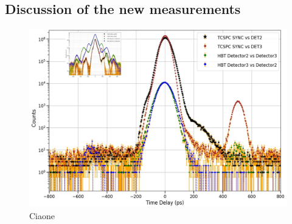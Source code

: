 \subsection{Discussion of the new measurements}
\begin{figure}[hbtp]
\centering
\includegraphics[width=1\textwidth]{CheckpointBravo_vs_Khaos.jpg}
\caption{Ciaone}
\label{RefinedMeasurement}
\end{figure}



